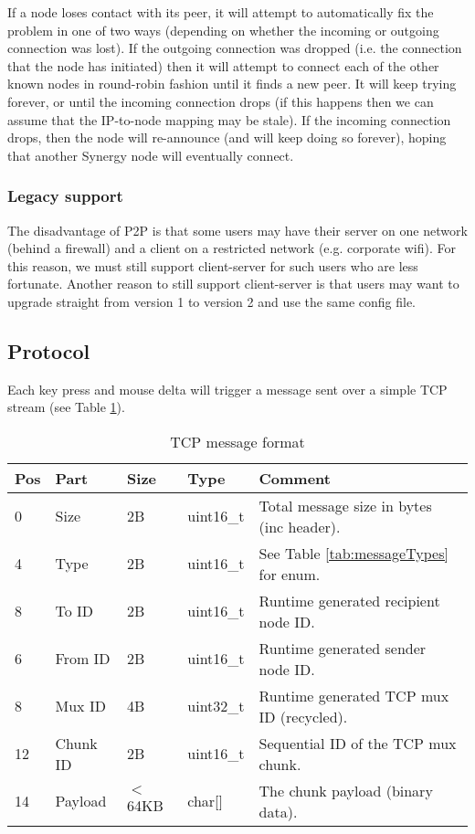 If a node loses contact with its peer, it will attempt to automatically fix
the problem in one of two ways (depending on whether the incoming or outgoing 
connection was lost). If the outgoing connection was dropped (i.e. the 
connection that the node has initiated) then it will attempt to connect each 
of the other known nodes in round-robin fashion until it finds a new peer. It 
will keep trying forever, or until the incoming connection drops (if this 
happens then we can assume that the IP-to-node mapping may be stale). If
the incoming connection drops, then the node will re-announce (and will keep
doing so forever), hoping that another Synergy node will eventually connect.

\subsubsection{Legacy support}

The disadvantage of P2P is that some users may have their server on one network
(behind a firewall) and a client on a restricted network (e.g. corporate wifi).
For this reason, we must still support client-server for such users who are 
less fortunate. Another reason to still support client-server is that users may
want to upgrade straight from version 1 to version 2 and use the same config 
file.

\subsection{Protocol}

Each key press and mouse delta will trigger a message sent over a simple TCP 
stream (see Table \ref{tab:messageFormat}).

\begin{table}[ht!]
  \begin{tabular}{|l|l|l|l|l|}
    \hline
    \textbf{Pos} &
    \textbf{Part} &
    \textbf{Size} &
    \textbf{Type} &
    \textbf{Comment} \\
    \hline
    0 & Size & 2B & uint16\_t & Total message size in bytes (inc header). \\
    4 & Type & 2B & uint16\_t & See Table \ref{tab:messageTypes} for enum. \\
    8 & To ID & 2B & uint16\_t & Runtime generated recipient node ID. \\
    6 & From ID & 2B & uint16\_t & Runtime generated sender node ID. \\
    8 & Mux ID & 4B & uint32\_t & Runtime generated TCP mux ID (recycled). \\
    12 & Chunk ID & 2B & uint16\_t & Sequential ID of the TCP mux chunk. \\
    14 & Payload & $<$64KB & char[] & The chunk payload (binary data). \\
    \hline
  \end{tabular}
  \caption{TCP message format}
  \label{tab:messageFormat}
\end{table}

